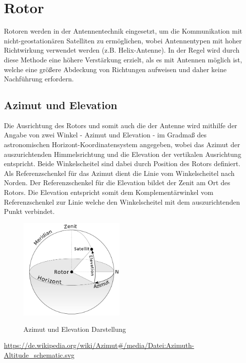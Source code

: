 \chapter{Rotor}
Rotoren werden in der Antennentechnik eingesetzt, um die Kommunikation mit nicht-geostationären Satelliten zu ermöglichen, wobei Antennentypen mit hoher Richtwirkung verwendet werden (z.B. Helix-Antenne). In der Regel wird durch diese Methode eine höhere Verstärkung erzielt, als es mit Antennen möglich ist, welche eine größere Abdeckung von Richtungen aufweisen und daher keine Nachführung erfordern. 
\section{Azimut und Elevation}
Die Ausrichtung des Rotors und somit auch die der Antenne wird mithilfe der Angabe von zwei Winkel - Azimut und Elevation - im Gradmaß des astronomischen Horizont-Koordinatensystem angegeben, wobei das Azimut der auszurichtenden Himmelsrichtung und die Elevation der vertikalen Ausrichtung entspricht. Beide Winkelscheitel sind dabei durch Position des Rotors definiert. Als Referenzschenkel für das Azimut dient die Linie vom Winkelscheitel nach Norden. Der Referenzschenkel für die Elevation bildet der Zenit am Ort des Rotors. Die Elevation entspricht somit dem Komplementärwinkel vom Referenzschenkel zur Linie welche den Winkelscheitel mit dem auszurichtenden Punkt verbindet.

\begin{figure}[H]
	\centering
	\includegraphics[width=5.2cm]{../ref/Azimuth-Altitude_schematic_satellit.png}
	\label{fig:Azimut_Elevation_Schematic}
	\caption{Azimut und Elevation Darstellung}
\end{figure}

\url{https://de.wikipedia.org/wiki/Azimut#/media/Datei:Azimuth-Altitude_schematic.svg}